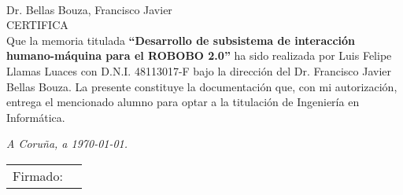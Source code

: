 \thispagestyle{empty}
\mbox{}\\[4cm]
\noindent Dr. Bellas Bouza, Francisco Javier \\[1cm]
\textsc{CERTIFICA}\\[1.5cm]
\indent Que la memoria titulada \textbf{``Desarrollo de subsistema de interacción humano-máquina para el ROBOBO 2.0''}
ha sido realizada por Luis Felipe Llamas Luaces con D.N.I. 48113017-F bajo la
dirección del Dr. Francisco Javier Bellas Bouza. La presente constituye la
documentación que, con mi autorización, entrega el mencionado
alumno para optar a la titulación de Ingeniería en Informática.
\vfill
\begin{flushright}
\emph{A Coruña, a \today{}.} \\[2cm]
\begin{tabular}{ll}
Firmado: & \\
\end{tabular}
\end{flushright}